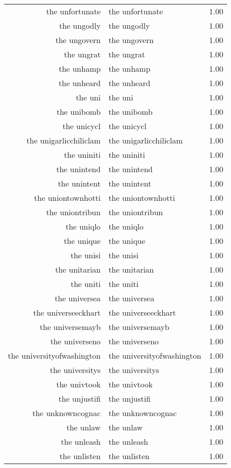 \begin{table}[ht]
\begin{tabular}{rlr}
  the unfortunate & the unfortunate & 1.00 \\ 
  the ungodly & the ungodly & 1.00 \\ 
  the ungovern & the ungovern & 1.00 \\ 
  the ungrat & the ungrat & 1.00 \\ 
  the unhamp & the unhamp & 1.00 \\ 
  the unheard & the unheard & 1.00 \\ 
  the uni & the uni & 1.00 \\ 
  the unibomb & the unibomb & 1.00 \\ 
  the unicycl & the unicycl & 1.00 \\ 
  the unigarlicchiliclam & the unigarlicchiliclam & 1.00 \\ 
  the uniniti & the uniniti & 1.00 \\ 
  the unintend & the unintend & 1.00 \\ 
  the unintent & the unintent & 1.00 \\ 
  the uniontownhotti & the uniontownhotti & 1.00 \\ 
  the uniontribun & the uniontribun & 1.00 \\ 
  the uniqlo & the uniqlo & 1.00 \\ 
  the unique & the unique & 1.00 \\ 
  the unisi & the unisi & 1.00 \\ 
  the unitarian & the unitarian & 1.00 \\ 
  the uniti & the uniti & 1.00 \\ 
  the universea & the universea & 1.00 \\ 
  the universeeckhart & the universeeckhart & 1.00 \\ 
  the universemayb & the universemayb & 1.00 \\ 
  the universeno & the universeno & 1.00 \\ 
  the universityofwashington & the universityofwashington & 1.00 \\ 
  the universitys & the universitys & 1.00 \\ 
  the univtook & the univtook & 1.00 \\ 
  the unjustifi & the unjustifi & 1.00 \\ 
  the unknowncognac & the unknowncognac & 1.00 \\ 
  the unlaw & the unlaw & 1.00 \\ 
  the unleash & the unleash & 1.00 \\ 
  the unlisten & the unlisten & 1.00 \\ 

\end{tabular}
\end{table}
